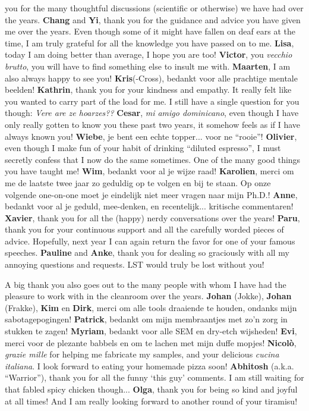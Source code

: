 you for the many thoughtful discussions (scientific or otherwise) we have had over the years. \textbf{Chang}
and \textbf{Yi}, thank you for the guidance and advice you have given me over the years. Even though some of
it might have fallen on deaf ears at the time, I am truly grateful for all the knowledge you have passed on to
me. \textbf{Lisa}, today I am doing better than average, I hope you are too! \textbf{Victor}, you \textit{vecchio
brutto}, you will have to find something else to insult me with. \textbf{Maarten}, I am also always happy to
see you! \textbf{Kris}(-Cross), bedankt voor alle prachtige mentale beelden! \textbf{Kathrin}, thank you for
your kindness and empathy. It really felt like you wanted to carry part of the load for me. I still
have a single question for you though: \textit{Vere are ze hoarzes??} \textbf{Cesar}, \textit{mi amigo
dominicano}, even though I have only really gotten to know you these past two years, it somehow feels as if I
have always known you! \textbf{Wiebe}, je bent een echte topper... voor ne ``rooie''! \textbf{Olivier}, even
though I make fun of your habit of drinking ``diluted espresso'', I must secretly confess that I now do the
same sometimes. One of the many good things you have taught me! \textbf{Wim}, bedankt voor al je wijze raad!
\textbf{Karolien}, merci om me de laatste twee jaar zo geduldig op te volgen en bij te staan. Op onze volgende
one-on-one moet je eindelijk niet meer vragen naar mijn Ph.D.! \textbf{Anne}, bedankt voor al je geduld,
mee-denken, en recentelijk... kritische commentaren! \textbf{Xavier}, thank you for all the (happy) nerdy
conversations over the years! \textbf{Paru}, thank you for your continuous support and all the carefully
worded pieces of advice. Hopefully, next year I can again return the favor for one of your famous speeches.
\textbf{Pauline} and \textbf{Anke}, thank you for dealing so graciously with all my annoying questions and
requests. LST would truly be lost without you!

A big thank you also goes out to the many people with whom I have had the pleasure to work with in the
cleanroom over the years. \textbf{Johan} (Jokke), \textbf{Johan} (Frakke), \textbf{Kim} en \textbf{Dirk},
merci om alle tools draaiende te houden, ondanks mijn sabotagepogingen! \textbf{Patrick}, bedankt om mijn
membraantjes met zo'n zorg in stukken te zagen! \textbf{Myriam}, bedankt voor alle SEM en dry-etch wijsheden!
\textbf{Evi}, merci voor de plezante babbels en om te lachen met mijn duffe mopjes! \textbf{Nicol\`{o}},
\textit{grazie mille} for helping me fabricate my samples, and your delicious \textit{cucina italiana}. I look
forward to eating your homemade pizza soon! \textbf{Abhitosh} (a.k.a. ``Warrior''), thank you for all the
funny `this guy' comments. I am still waiting for that fabled spicy chicken though... \textbf{Olga}, thank you
for being so kind and joyful at all times! And I am really looking forward to another round of your tiramisu!

